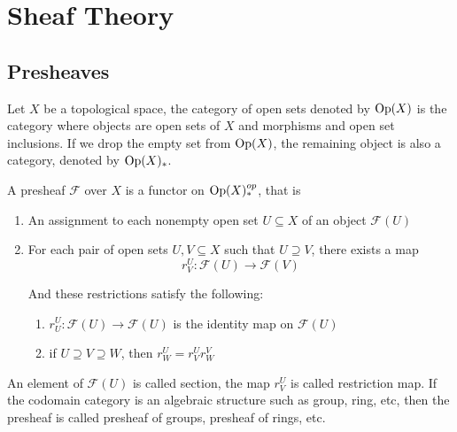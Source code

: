 \chapter{Sheaf Theory}

\section{Presheaves}

\begin{definition}
	Let $X$ be a topological space, the category of open sets denoted by $\operatorname{Op}(X)$ is the category where objects are open sets of $X$ and morphisms and open set inclusions. If we drop the empty set from $\operatorname{Op}(X)$, the remaining object is also a category, denoted by $\operatorname{Op}(X)_*$.
	
	A presheaf $\mathcal{F}$ over $X$ is a functor on $\operatorname{Op}(X)_*^{op}$, that is
	\begin{enumerate}
		\item An assignment to each nonempty open set $U \subseteq X$ of an object $\mathcal{F}(U)$
		\item For each pair of open sets $U, V \subseteq X$ such that $U \supseteq V$, there exists a map
		$$
		r^U_V: \mathcal{F}(U) \to \mathcal{F}(V)
		$$
		
		And these restrictions satisfy the following:
		\begin{enumerate}
			\item $r^U_U: \mathcal{F}(U) \to \mathcal{F}(U)$ is the identity map on $\mathcal{F}(U)$
			\item if $U \supseteq V \supseteq W$, then $r^U_W = r^U_V r^V_W$
		\end{enumerate}
	\end{enumerate}
	
	An element of $\mathcal{F}(U)$ is called section, the map $r^U_V$ is called restriction map. If the codomain category is an algebraic structure such as group, ring, etc, then the presheaf is called presheaf of groups, presheaf of rings, etc.
\end{definition}

